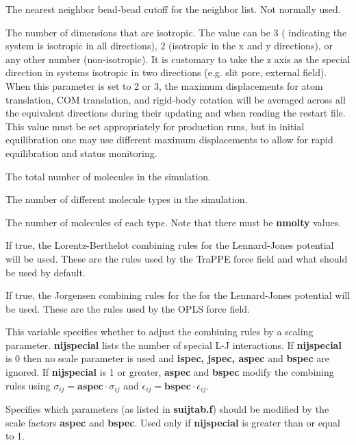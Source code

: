 \documentclass[12pt,letterpaper]{article}
\begin{document}
 The nearest neighbor bead-bead cutoff for the neighbor
list.  Not normally used.

 The number
of dimensions that are isotropic. The value can be 3 (
indicating the system is isotropic in all directions), 2
(isotropic in the x and y directions), or any other number
(non-isotropic). It is customary to take the z axis as the
special direction in systems isotropic in two directions
(e.g. slit pore, external field). When this parameter is set
to 2 or 3, the maximum displacements for atom translation,
COM translation, and rigid-body rotation will be averaged
across all the equivalent directions during their updating
and when reading the restart file. This value must be set
appropriately for production runs, but in initial
equilibration one may use different maximum displacements to
allow for rapid equilibration and status monitoring.

 The total number of molecules in the simulation.

 The number of different molecule types in the
simulation.

 The number of molecules of each type.  
Note that there must be \textbf{nmolty} values. 

 If true, the Lorentz-Berthelot combining rules
for the Lennard-Jones potential will be used.  These are the rules used by the 
TraPPE force field and what should be used by default.

 If true, the Jorgensen combining rules for the 
for the Lennard-Jones potential will be used.  These are the rules used by the
OPLS force field.

 This variable specifies whether to adjust the combining rules by a scaling parameter.
{\textbf{nijspecial}} lists the number of special L-J interactions.
If {\textbf{nijspecial}} is 0 then no scale parameter is used and {\textbf {ispec, jspec, aspec}} and {\textbf {bspec}} are ignored.
If {\textbf{nijspecial}} is 1 or greater, {\textbf{aspec}} and {\textbf{bspec}} modify the combining rules using $\sigma_{ij}={\textbf{aspec}}\cdot\sigma_{ij}$ and $\epsilon_{ij}={\textbf{bspec}}\cdot\epsilon_{ij}$.  

 Specifies which parameters (as listed in {\textbf {suijtab.f}}) 
should be modified by the scale factors {\textbf{aspec}} and {\textbf{bspec}}.
Used only if {\textbf{nijspecial}} is greater than or equal to 1.
\end{document}
